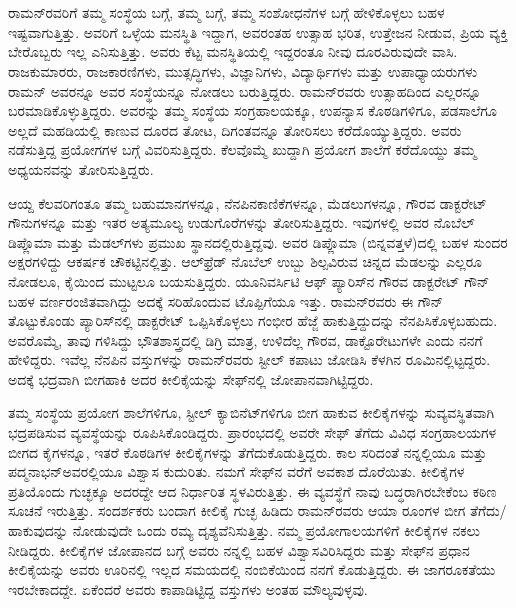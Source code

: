 
\chapter{}


ರಾಮನ್‍ರವರಿಗೆ ತಮ್ಮ ಸಂಸ್ಥೆಯ ಬಗ್ಗೆ, ತಮ್ಮ ಬಗ್ಗೆ, ತಮ್ಮ ಸಂಶೋಧನೆಗಳ ಬಗ್ಗೆ ಹೇಳಿಕೊಳ್ಳಲು ಬಹಳ ಇಷ್ಟವಾಗುತ್ತಿತ್ತು. ಅವರಿಗೆ ಒಳ್ಳೆಯ ಮನಸ್ಥಿತಿ ಇದ್ದಾಗ, ಅವರಂತಹ ಉತ್ಸಾಹ ಭರಿತ, ಉತ್ತೇಜನ ನೀಡುವ, ಪ್ರಿಯ ವ್ಯಕ್ತಿ ಬೇರೊಬ್ಬರು ಇಲ್ಲ ಎನಿಸುತ್ತಿತ್ತು. ಅವರು ಕೆಟ್ಟ ಮನಸ್ಥಿತಿಯಲ್ಲಿ ಇದ್ದರಂತೂ ನೀವು ದೂರವಿರುವುದೇ ವಾಸಿ. ರಾಜಕುಮಾರರು, ರಾಜಕಾರಣಿಗಳು, ಮುತ್ಸದ್ಧಿಗಳು, ವಿಜ್ಞಾನಿಗಳು, ವಿದ್ಯಾರ್ಥಿಗಳು ಮತ್ತು ಉಪಾಧ್ಯಾಯರುಗಳು ರಾಮನ್ ಅವರನ್ನೂ ಅವರ ಸಂಸ್ಥೆಯನ್ನೂ ನೋಡಲು ಬರುತ್ತಿದ್ದರು. ರಾಮನ್‍ರವರು ಉತ್ಸಾಹದಿಂದ ಎಲ್ಲರನ್ನೂ ಬರಮಾಡಿಕೊಳ್ಳುತ್ತಿದ್ದರು. ಅವರನ್ನು ತಮ್ಮ ಸಂಸ್ಥೆಯ ಸಂಗ್ರಹಾಲಯಕ್ಕೂ, ಉಪನ್ಯಾಸ ಕೊಠಡಿಗಳಿಗೂ, ಪಡಸಾಲೆಗೂ ಅಲ್ಲದೆ ಮಹಡಿಯಲ್ಲಿ ಕಾಣುವ ದೂರದ ತೋಟ, ದಿಗಂತವನ್ನೂ ತೋರಿಸಲು ಕರೆದೊಯ್ಯುತ್ತಿದ್ದರು. ಅವರು ನಡೆಸುತ್ತಿದ್ದ ಪ್ರಯೋಗಗಳ ಬಗ್ಗೆ ವಿವರಿಸುತ್ತಿದ್ದರು. ಕೆಲವೊಮ್ಮೆ ಖುದ್ದಾಗಿ ಪ್ರಯೋಗ ಶಾಲೆಗೆ ಕರೆದೊಯ್ದು ತಮ್ಮ ಅಧ್ಯಯನವನ್ನು ತೋರಿಸುತ್ತಿದ್ದರು.

ಆಯ್ದ ಕೆಲವರಿಗಂತೂ ತಮ್ಮ ಬಹುಮಾನಗಳನ್ನೂ, ನೆನಪಿನಕಾಣಿಕೆಗಳನ್ನೂ, ಮೆಡಲುಗಳನ್ನೂ, ಗೌರವ ಡಾಕ್ಟರೇಟ್ ಗೌನುಗಳನ್ನೂ ಮತ್ತು ಇತರ ಅತ್ಯಮೂಲ್ಯ ಉಡುಗೊರೆಗಳನ್ನು ತೋರಿಸುತ್ತಿದ್ದರು. ಇವುಗಳಲ್ಲಿ ಅವರ ನೊಬೆಲ್ ಡಿಪ್ಲೊಮಾ ಮತ್ತು ಮೆಡಲ್‍ಗಳು ಪ್ರಮುಖ ಸ್ಥಾನದಲ್ಲಿರುತ್ತಿದ್ದವು. ಅವರ ಡಿಪ್ಲೊಮಾ (ಬಿನ್ನವತ್ತಳೆ)ದಲ್ಲಿ ಬಹಳ ಸುಂದರ ಅಕ್ಷರಗಳಿದ್ದು ಆಕರ್ಷಕ ಚೌಕಟ್ಟಿನಲ್ಲಿತ್ತು. ಆಲ್‍ಫ್ರೆಡ್ ನೊಬೆಲ್ ಉಬ್ಬು ಶಿಲ್ಪವಿರುವ ಚಿನ್ನದ ಮೆಡಲನ್ನು ಎಲ್ಲರೂ ನೋಡಲೂ, ಕೈಯಿಂದ ಮುಟ್ಟಲೂ ಬಯಸುತ್ತಿದ್ದರು. ಯೂನಿವರ್ಸಿಟಿ ಆಫ್ ಪ್ಯಾರಿಸ್‍ನ ಗೌರವ ಡಾಕ್ಟರೇಟ್ ಗೌನ್ ಬಹಳ ವರ್ಣರಂಜಿತವಾಗಿದ್ದು ಅದಕ್ಕೆ ಸರಿಹೊಂದುವ ಟೊಪ್ಪಿಗೆಯೂ ಇತ್ತು. ರಾಮನ್‍ರವರು ಈ ಗೌನ್ ತೊಟ್ಟುಕೊಂಡು ಪ್ಯಾರಿಸ್‍ನಲ್ಲಿ ಡಾಕ್ಟರೇಟ್ ಒಪ್ಪಿಸಿಕೊಳ್ಳಲು ಗಂಭೀರ ಹೆಜ್ಜೆ ಹಾಕುತ್ತಿದ್ದುದನ್ನು ನೆನಪಿಸಿಕೊಳ್ಳಬಹುದು. ಅವರೊಮ್ಮೆ, ತಾವು ಗಳಿಸಿದ್ದು ಭೌತಶಾಸ್ತ್ರದಲ್ಲಿ ಡಿಗ್ರಿ ಮಾತ್ರ, ಉಳಿದೆಲ್ಲ ಗೌರವ, ಡಾಕ್ಟೊರೇಟುಗಳೇ ಎಂದು ನನಗೆ ಹೇಳಿದ್ದರು. ಇವೆಲ್ಲ ನೆನಪಿನ ವಸ್ತುಗಳನ್ನು ರಾಮನ್‍ರವರು ಸ್ಟೀಲ್ ಕಪಾಟು ಜೋಡಿಸಿ ಕೆಳಗಿನ ರೂಮಿನಲ್ಲಿಟ್ಟದ್ದರು. ಅದಕ್ಕೆ ಭದ್ರವಾಗಿ ಬೀಗಹಾಕಿ ಅದರ ಕೀಲಿಕೈಯನ್ನು ಸೇಫ್‍ನಲ್ಲಿ ಜೋಪಾನವಾಗಿಟ್ಟಿದ್ದರು.

ತಮ್ಮ ಸಂಸ್ಥೆಯ ಪ್ರಯೋಗ ಶಾಲೆಗಳಿಗೂ, ಸ್ಟೀಲ್ ಕ್ಯಾಬಿನೆಟ್‍ಗಳಿಗೂ ಬೀಗ ಹಾಕುವ ಕೀಲಿಕೈ\-ಗಳನ್ನು ಸುವ್ಯವಸ್ಥಿತವಾಗಿ ಭದ್ರಪಡಿಸುವ ವ್ಯವಸ್ಥೆಯನ್ನು ರೂಪಿಸಿಕೊಂಡಿದ್ದರು. ಪ್ರಾರಂಭದಲ್ಲಿ ಅವರೇ ಸೇಫ್ ತೆಗೆದು ವಿವಿಧ ಸಂಗ್ರಹಾಲಯಗಳ ಬೀಗದ ಕೈಗಳನ್ನೂ, ಇತರೆ ಕೊಠಡಿಗಳ ಕೀಲಿಕೈಗಳನ್ನು ತೆಗೆದುಕೊಡುತ್ತಿದ್ದರು. ಕಾಲ ಸರಿದಂತೆ ನನ್ನಲ್ಲಿಯೂ ಮತ್ತು ಪದ್ಮನಾಭನ್\break ಅವರಲ್ಲಿಯೂ ವಿಶ್ವಾಸ ಕುದುರಿತು. ನಮಗೆ ಸೇಫ್‍ನ ವರೆಗೆ ಅವಕಾಶ ದೊರೆಯಿತು. ಕೀಲಿಕೈಗಳ ಪ್ರತಿಯೊಂದು ಗುಚ್ಛಕ್ಕೂ ಅದರದ್ದೇ ಆದ ನಿರ್ಧಾರಿತ ಸ್ಥಳವಿರುತ್ತಿತ್ತು. ಈ ವ್ಯವಸ್ಥೆಗೆ ನಾವು ಬದ್ಧರಾಗಿರಬೇಕೆಂಬ ಕಠಿಣ ಸೂಚನೆ ಇರುತ್ತಿತ್ತು. ಸಂದರ್ಶಕರು ಬಂದಾಗ ಕೀಲಿಕೈ ಗುಚ್ಛ ಹಿಡಿದು ರಾಮನ್‍ರವರು ಆಯಾ ರೂಂಗಳ ಬೀಗ ತೆಗೆದು/ಹಾಕುವುದನ್ನು ನೋಡುವುದೇ ಒಂದು ರಮ್ಯ ದೃಶ್ಯವೆನಿಸುತ್ತಿತ್ತು. ನಮ್ಮ ಪ್ರಯೋಗಾಲಯಗಳಿಗೆ ಕೀಲಿಕೈಗಳ ನಕಲು ನೀಡಿದ್ದರು. ಕೀಲಿಕೈಗಳ ಜೋಪಾನದ ಬಗ್ಗೆ ಅವರು ನನ್ನಲ್ಲಿ ಬಹಳ ವಿಶ್ವಾಸವಿರಿಸಿದ್ದರು ಮತ್ತು ಸೇಫ್‍ನ ಪ್ರಧಾನ ಕೀಲಿಕೈಯನ್ನು ಅವರು ಊರಿನಲ್ಲಿ ಇಲ್ಲದ ಸಮಯದಲ್ಲಿ ನಂಬಿಕೆಯಿಂದ ನನಗೆ ಕೊಡುತ್ತಿದ್ದರು. ಈ ಜಾಗರೂಕತೆಯು ಇರಬೇಕಾದದ್ದೇ. ಏಕೆಂದರೆ ಅವರು ಕಾಪಾಡಿಟ್ಟಿದ್ದ ವಸ್ತುಗಳು ಅಂತಹ ಮೌಲ್ಯವುಳ್ಳವು.

